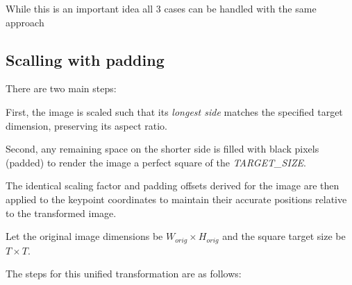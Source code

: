 While this is an important idea all 3 cases can be handled with the same approach

\subsection{Scalling with padding}

There are two main steps:

First, the image is scaled such that its \textit{longest side} matches the specified
target dimension, preserving its aspect ratio.

Second, any remaining space on the shorter side is filled with black pixels (padded) to render the image a
perfect square of the \textit{TARGET\_SIZE}.

The identical scaling factor and
padding offsets derived for the image are then applied to the keypoint
coordinates to maintain their accurate positions relative to the transformed
image.

Let the original image dimensions be $W_{orig} \times H_{orig}$ and the square target size be $T \times T$.

The steps for this unified transformation are as follows:


